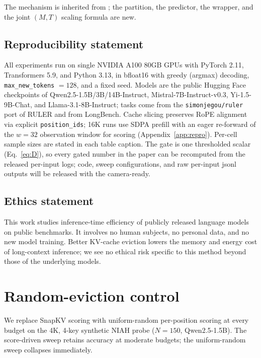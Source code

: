 \documentclass{article}
\begin{document}
The mechanism is inherited from \citet{arxiv260509649}; the partition,
the predictor, the wrapper, and the joint $(M, T)$ scaling formula are
new.

\subsection*{Reproducibility statement}

All experiments run on single NVIDIA A100 80GB GPUs with PyTorch 2.11,
Transformers 5.9, and Python 3.13, in bfloat16 with greedy (argmax)
decoding, \texttt{max\_new\_tokens} $= 128$, and a fixed seed. Models
are the public Hugging Face checkpoints of Qwen2.5-1.5B/3B/14B-Instruct,
Mistral-7B-Instruct-v0.3, Yi-1.5-9B-Chat, and Llama-3.1-8B-Instruct;
tasks come from the \texttt{simonjegou/ruler} port of RULER and from
LongBench. Cache slicing preserves RoPE alignment via explicit
\texttt{position\_ids}; 16K runs use SDPA prefill with an eager
re-forward of the $w = 32$ observation window for scoring
(Appendix~\ref{app:repro}). Per-cell sample sizes are stated in each
table caption. The gate is one thresholded scalar (Eq.~\eqref{eq:D}),
so every gated number in the paper can be recomputed from the released
per-input logs; code, sweep configurations, and raw per-input jsonl
outputs will be released with the camera-ready.

\subsection*{Ethics statement}

This work studies inference-time efficiency of publicly released
language models on public benchmarks. It involves no human subjects,
no personal data, and no new model training. Better KV-cache eviction
lowers the memory and energy cost of long-context inference; we see no
ethical risk specific to this method beyond those of the underlying
models.




\appendix

\section{Random-eviction control}
\label{app:random}

We replace SnapKV scoring with uniform-random per-position scoring at every
budget on the 4K, 4-key synthetic NIAH probe ($N = 150$, Qwen2.5-1.5B). The
score-driven sweep retains accuracy at moderate budgets; the uniform-random
sweep collapses immediately.
\end{document}
